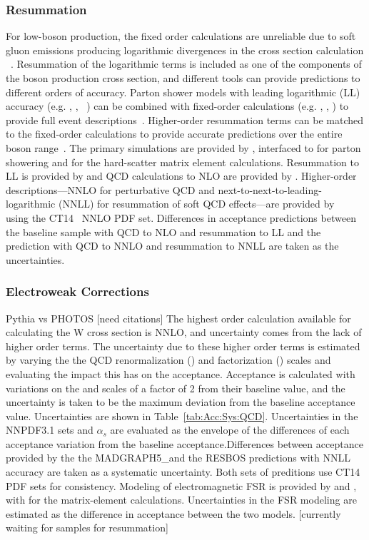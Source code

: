 \subsubsection{Resummation}
For low-\pt boson production, the fixed order calculations are unreliable due to soft gluon emissions producing logarithmic divergences in the cross section calculation
~\cite{Collins:1984kg}. Resummation of the logarithmic terms is included as one of the components of the boson production cross section, and different tools can provide predictions to different orders of accuracy. Parton shower models with leading logarithmic (LL) accuracy (e.g. \PYTHIA, \SHERPA, \HERWIG ~\cite{Sjostrand:2014zea,Gleisberg:2008ta,Bahr:2008pv}) can be combined with fixed-order calculations (e.g. \aMCATNLO, \MINLO, \POWHEG) to provide full event descriptions~\cite{Nason:2004rx,Frixione:2002ik,Alioli:2010xd,Alwall:2014hca}. Higher-order resummation terms can be matched to the fixed-order calculations to provide accurate predictions over the entire boson \pt range~\cite{Balazs:1995nz,Catani:2015vma}. 
The primary simulations are provided by \aMCATNLO, interfaced to  for parton showering and  for the hard-scatter matrix element calculations. Resummation to LL is provided by  and QCD calculations to NLO are provided by . Higher-order descriptions---NNLO for perturbative QCD and next-to-next-to-leading-logarithmic (NNLL) for resummation of soft QCD effects---are provided by \RESBOS~\cite{Ladinsky:1993zn, Balazs:1997xd, Landry:2002ix} using the CT14~\cite{Dulat:2015mca} NNLO PDF set.  Differences in acceptance predictions between the baseline sample with QCD to NLO and resummation to LL and the \RESBOS prediction with QCD to NNLO and resummation to NNLL are taken as the uncertainties.

\subsubsection{Electroweak Corrections}
Pythia vs PHOTOS [need citations]
The highest order calculation available for calculating the W cross section is NNLO, and uncertainty comes from the lack of higher order terms. The uncertainty due to these higher order terms is estimated by varying the the QCD renormalization (\mur) and factorization (\muf) scales and evaluating the impact this has on the acceptance. Acceptance is calculated with variations on the \mur and \muf scales of a factor of 2 from their baseline value, and the uncertainty is taken to be the maximum deviation from the baseline acceptance value. Uncertainties are shown in  Table~\ref{tab:Acc:Sys:QCD}. Uncertainties in the NNPDF3.1 sets and $\alpha_s$ are evaluated as the envelope of the differences of each acceptance variation from the baseline acceptance.Differences between acceptance provided by the the MADGRAPH5\_\aMCATNLO and the RESBOS predictions with NNLL accuracy are taken as a systematic uncertainty. Both sets of preditions use CT14 PDF sets for consistency. Modeling of electromagnetic FSR is provided by \PYTHIA and \PHOTOS, with \POWHEG for the matrix-element calculations. Uncertainties in the FSR modeling are estimated as the difference in acceptance between the two models.
[currently waiting for samples for resummation]


